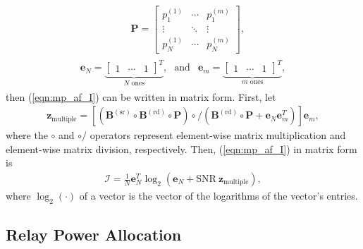 \begin{eqnarray}
 & \mathbf{P} = \left[ \begin{array}{ccc}
p_1^{(1)} & \cdots & p_1^{(m)} \\
\vdots & \ddots & \vdots \\
p_N^{(1)} & \cdots & p_N^{(m)}
\end{array}
\right] \mbox{,}
\label{}
\end{eqnarray}
\begin{eqnarray}
\begin{array}{ccc}
\mathbf{e}_N = \underbrace{\left[ \begin{array}{ccc}
1 & \cdots & 1
\end{array}
\right]^T}_{\mbox{$N$ ones}} \mbox{,}& \mbox{and} &
\mathbf{e}_m = \underbrace{\left[ \begin{array}{ccc}
1 & \cdots & 1
\end{array}
\right]^T}_{\mbox{$m$ ones}},
\end{array}
\label{}
\end{eqnarray}
then (\ref{eqn:mp_af_I}) can be written in matrix form.  First, let
\begin{eqnarray}
\mathbf{z}_{\mbox{multiple}} = 
\left[ \left( \mathbf{B}^{(\mbox{sr})} \circ \mathbf{B}^{(\mbox{rd})} \circ \mathbf{P}  \right) \circ / \left( \mathbf{B}^{(\mbox{rd})} \circ \mathbf{P}  + \mathbf{e}_N \mathbf{e}_m^T \right) \right] \mathbf{e}_m,
\end{eqnarray}
where the $\circ$ and $\circ /$ operators represent element-wise matrix multiplication and element-wise matrix division, respectively.  Then, (\ref{eqn:mp_af_I}) in matrix form is
\begin{eqnarray}
\mathcal{I} = \frac{1}{N} \mathbf{e}_N^T \log_2 \left( \mathbf{e}_N + \mbox{SNR} \: \mathbf{z}_{\mbox{multiple}} \right) ,
\label{eqn:mp_af_I_matrix}
\end{eqnarray}
where $\log_2\left( \cdot \right)$ of a vector is the vector of the logarithms of the vector's entries.

\subsection{Relay Power Allocation}
\label{subsec:mp_af_rpa}

